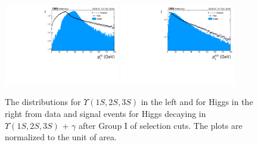 \begin{figure}[!htbp]
\begin{center}
\includegraphics[width=0.45\textwidth]{figures_and_tables/outputPlots/HtoUpsilon_Cat0_ZZZZZ/au/data_x_mc/noKinCuts/h_noKin_Upsilon_Pt}\hspace*{1.cm}
\includegraphics[width=0.45\textwidth]{figures_and_tables/outputPlots/HtoUpsilon_Cat0_ZZZZZ/au/data_x_mc/noKinCuts/h_noKin_Z_Pt}
\end{center}\vspace*{-.5cm}
\caption{The \PT distributions for $\Upsilon(1S,2S,3S)$ in the left and for Higgs in the right from data and signal events for Higgs decaying in $\Upsilon(1S,2S,3S)$ + $\gamma$ after Group I of selection cuts. The plots are normalized to the unit of area.}
\label{fig:pTUpsilon_and_Higgs_HtoUpsilon_Cat0}
\end{figure}


